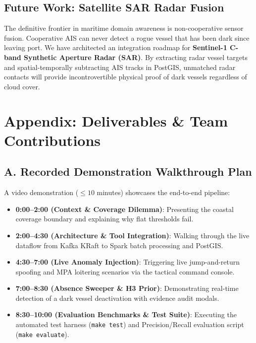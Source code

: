 \documentclass[10pt,twocolumn,a4paper]{article}
\begin{document}
\subsection{Future Work: Satellite SAR Radar Fusion}
The definitive frontier in maritime domain awareness is non-cooperative sensor fusion. Cooperative AIS can never detect a rogue vessel that has been dark since leaving port. We have architected an integration roadmap for \textbf{Sentinel-1 C-band Synthetic Aperture Radar (SAR)}. By extracting radar vessel targets and spatial-temporally subtracting AIS tracks in PostGIS, unmatched radar contacts will provide incontrovertible physical proof of dark vessels regardless of cloud cover.

\section*{Appendix: Deliverables \& Team Contributions}

\subsection*{A. Recorded Demonstration Walkthrough Plan}
A video demonstration ($\le 10$ minutes) showcases the end-to-end pipeline:
\begin{itemize}[leftmargin=*]
    \item \textbf{0:00--2:00 (Context \& Coverage Dilemma)}: Presenting the coastal coverage boundary and explaining why flat thresholds fail.
    \item \textbf{2:00--4:30 (Architecture \& Tool Integration)}: Walking through the live dataflow from Kafka KRaft to Spark batch processing and PostGIS.
    \item \textbf{4:30--7:00 (Live Anomaly Injection)}: Triggering live jump-and-return spoofing and MPA loitering scenarios via the tactical command console.
    \item \textbf{7:00--8:30 (Absence Sweeper \& H3 Prior)}: Demonstrating real-time detection of a dark vessel deactivation with evidence audit modals.
    \item \textbf{8:30--10:00 (Evaluation Benchmarks \& Test Suite)}: Executing the automated test harness (\texttt{make test}) and Precision/Recall evaluation script (\texttt{make evaluate}).
\end{itemize}
\end{document}

